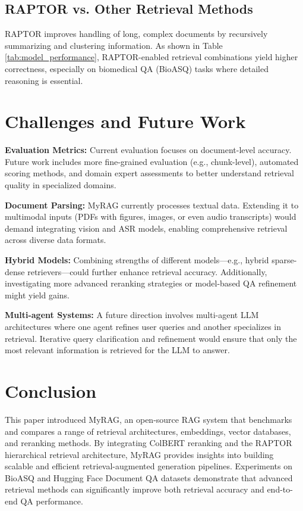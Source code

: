 \documentclass{scrartcl}
\begin{document}
\subsection{RAPTOR vs. Other Retrieval Methods}

RAPTOR improves handling of long, complex documents by recursively summarizing and clustering information. As shown in Table \ref{tab:model_performance}, RAPTOR-enabled retrieval combinations yield higher correctness, especially on biomedical QA (BioASQ) tasks where detailed reasoning is essential.

\section{Challenges and Future Work}

\textbf{Evaluation Metrics:} Current evaluation focuses on document-level accuracy. Future work includes more fine-grained evaluation (e.g., chunk-level), automated scoring methods, and domain expert assessments to better understand retrieval quality in specialized domains.

\textbf{Document Parsing:} MyRAG currently processes textual data. Extending it to multimodal inputs (PDFs with figures, images, or even audio transcripts) would demand integrating vision and ASR models, enabling comprehensive retrieval across diverse data formats.

\textbf{Hybrid Models:} Combining strengths of different models—e.g., hybrid sparse-dense retrievers—could further enhance retrieval accuracy. Additionally, investigating more advanced reranking strategies or model-based QA refinement might yield gains.

\textbf{Multi-agent Systems:} A future direction involves multi-agent LLM architectures where one agent refines user queries and another specializes in retrieval. Iterative query clarification and refinement would ensure that only the most relevant information is retrieved for the LLM to answer.

\section{Conclusion}

This paper introduced MyRAG, an open-source RAG system that benchmarks and compares a range of retrieval architectures, embeddings, vector databases, and reranking methods. By integrating ColBERT reranking and the RAPTOR hierarchical retrieval architecture, MyRAG provides insights into building scalable and efficient retrieval-augmented generation pipelines. Experiments on BioASQ and Hugging Face Document QA datasets demonstrate that advanced retrieval methods can significantly improve both retrieval accuracy and end-to-end QA performance.
\end{document}
